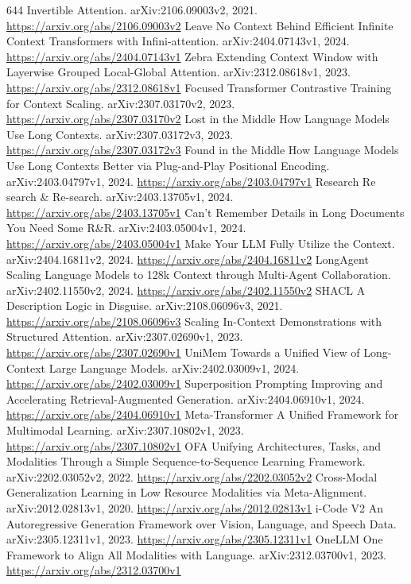 \documentclass[11pt]{article}
\begin{document}
\begin{thebibliography}{644}
 Invertible Attention. arXiv:2106.09003v2, 2021. \url{https://arxiv.org/abs/2106.09003v2}
 Leave No Context Behind Efficient Infinite Context Transformers with Infini-attention. arXiv:2404.07143v1, 2024. \url{https://arxiv.org/abs/2404.07143v1}
 Zebra Extending Context Window with Layerwise Grouped Local-Global Attention. arXiv:2312.08618v1, 2023. \url{https://arxiv.org/abs/2312.08618v1}
 Focused Transformer Contrastive Training for Context Scaling. arXiv:2307.03170v2, 2023. \url{https://arxiv.org/abs/2307.03170v2}
 Lost in the Middle How Language Models Use Long Contexts. arXiv:2307.03172v3, 2023. \url{https://arxiv.org/abs/2307.03172v3}
 Found in the Middle How Language Models Use Long Contexts Better via Plug-and-Play Positional Encoding. arXiv:2403.04797v1, 2024. \url{https://arxiv.org/abs/2403.04797v1}
 Research Re search \& Re-search. arXiv:2403.13705v1, 2024. \url{https://arxiv.org/abs/2403.13705v1}
 Can't Remember Details in Long Documents You Need Some R\&R. arXiv:2403.05004v1, 2024. \url{https://arxiv.org/abs/2403.05004v1}
 Make Your LLM Fully Utilize the Context. arXiv:2404.16811v2, 2024. \url{https://arxiv.org/abs/2404.16811v2}
 LongAgent Scaling Language Models to 128k Context through Multi-Agent Collaboration. arXiv:2402.11550v2, 2024. \url{https://arxiv.org/abs/2402.11550v2}
 SHACL A Description Logic in Disguise. arXiv:2108.06096v3, 2021. \url{https://arxiv.org/abs/2108.06096v3}
 Scaling In-Context Demonstrations with Structured Attention. arXiv:2307.02690v1, 2023. \url{https://arxiv.org/abs/2307.02690v1}
 UniMem Towards a Unified View of Long-Context Large Language Models. arXiv:2402.03009v1, 2024. \url{https://arxiv.org/abs/2402.03009v1}
 Superposition Prompting Improving and Accelerating Retrieval-Augmented Generation. arXiv:2404.06910v1, 2024. \url{https://arxiv.org/abs/2404.06910v1}
 Meta-Transformer A Unified Framework for Multimodal Learning. arXiv:2307.10802v1, 2023. \url{https://arxiv.org/abs/2307.10802v1}
 OFA Unifying Architectures, Tasks, and Modalities Through a Simple Sequence-to-Sequence Learning Framework. arXiv:2202.03052v2, 2022. \url{https://arxiv.org/abs/2202.03052v2}
 Cross-Modal Generalization Learning in Low Resource Modalities via Meta-Alignment. arXiv:2012.02813v1, 2020. \url{https://arxiv.org/abs/2012.02813v1}
 i-Code V2 An Autoregressive Generation Framework over Vision, Language, and Speech Data. arXiv:2305.12311v1, 2023. \url{https://arxiv.org/abs/2305.12311v1}
 OneLLM One Framework to Align All Modalities with Language. arXiv:2312.03700v1, 2023. \url{https://arxiv.org/abs/2312.03700v1}
\end{thebibliography}
\end{document}
